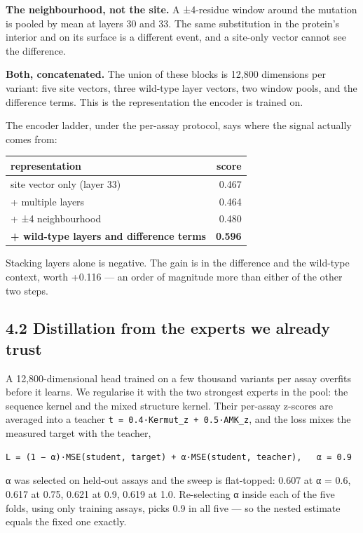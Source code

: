 \textbf{The neighbourhood, not the site.} A ±4-residue window around the mutation is pooled by mean at layers
30 and 33. The same substitution in the protein's interior and on its surface is a different event, and
a site-only vector cannot see the difference.

\textbf{Both, concatenated.} The union of these blocks is 12,800 dimensions per variant: five site vectors,
three wild-type layer vectors, two window pools, and the difference terms. This is the representation the
encoder is trained on.

The encoder ladder, under the per-assay protocol, says where the signal actually comes from:

\begin{longtable}[]{@{}lr@{}}
\toprule
representation & score \\
\midrule
\endhead
site vector only (layer 33) & 0.467 \\
+ multiple layers & 0.464 \\
+ ±4 neighbourhood & 0.480 \\
\textbf{+ wild-type layers and difference terms} & \textbf{0.596} \\
\bottomrule
\end{longtable}

Stacking layers alone is negative. The gain is in the difference and the wild-type context, worth
+0.116 --- an order of magnitude more than either of the other two steps.

\hypertarget{distillation-from-the-experts-we-already-trust}{%
\subsection{4.2 Distillation from the experts we already trust}\label{distillation-from-the-experts-we-already-trust}}

A 12,800-dimensional head trained on a few thousand variants per assay overfits before it learns. We
regularise it with the two strongest experts in the pool: the sequence kernel and the mixed structure
kernel. Their per-assay z-scores are averaged into a teacher \texttt{t\ =\ 0.4·Kermut\_z\ +\ 0.5·AMK\_z}, and the
loss mixes the measured target with the teacher,

\begin{verbatim}
L = (1 − α)·MSE(student, target) + α·MSE(student, teacher),   α = 0.9
\end{verbatim}

α was selected on held-out assays and the sweep is flat-topped: 0.607 at α = 0.6, 0.617 at 0.75, 0.621
at 0.9, 0.619 at 1.0. Re-selecting α inside each of the five folds, using only training assays, picks
0.9 in all five --- so the nested estimate equals the fixed one exactly.

